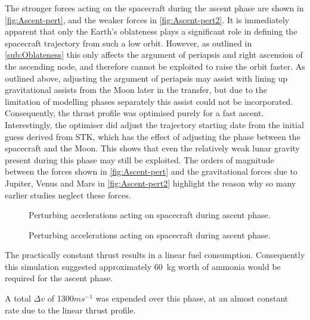 The stronger forces acting on the spacecraft during the ascent phase are shown in \autoref{fig:Ascent-pert}, and the weaker forces in \autoref{fig:Ascent-pert2}. It is immediately apparent that only the Earth's oblateness plays a significant role in defining the spacecraft trajectory from such a low orbit. However, as outlined in \autoref{sub:Oblateness} this only affects the argument of periapsis and right ascension of the ascending node, and therefore cannot be exploited to raise the orbit faster. As outlined above, adjusting the argument of periapsis may assist with lining up gravitational assists from the Moon later in the transfer, but due to the limitation of modelling phases separately this assist could not be incorporated. Consequently, the thrust profile was optimised purely for a fast ascent. Interestingly, the optimiser did adjust the trajectory starting date from the initial guess derived from STK, which has the effect of adjusting the phase between the spacecraft and the Moon. This shows that even the relatively weak lunar gravity present during this phase may still be exploited. The orders of magnitude between the forces shown in \autoref{fig:Ascent-pert} and the gravitational forces due to Jupiter, Venus and Mars in \autoref{fig:Ascent-pert2} highlight the reason why so many earlier studies neglect these forces. 

\begin{figure}
\centering
\def\svgwidth{\figurewidth}

\caption{Perturbing accelerations acting on spacecraft during ascent phase.}
\label{fig:Ascent-pert}
\end{figure}

\begin{figure}
\centering
\def\svgwidth{\figurewidth}

\caption{Perturbing accelerations acting on spacecraft during ascent phase.}
\label{fig:Ascent-pert2}
\end{figure}

The practically constant thrust results in a linear fuel consumption. Consequently this simulation suggested approximately 60~kg worth of ammonia would be required for the ascent phase. %

A total $\Delta v$ of 1300$ms^{-1}$ was expended over this phase, at an almost constant rate due to the linear thrust profile. %

%

